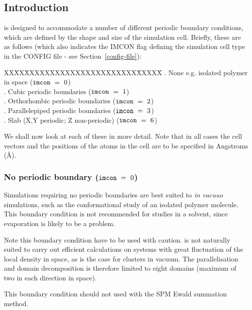 \label{boundary-conditions}
\subsection*{Introduction}

\D is designed to accommodate a number of different periodic
boundary conditions, which are defined
by the shape and size of the simulation cell.  Briefly, these are
as follows (which also indicates the IMCON flag defining the
simulation cell type in the CONFIG file - see Section~\ref{config-file}):
\begin{tabbing}
XX\=XX\=XXXXXXXXXXXXXXXXXXXXXX\=XXXXX\=\kill
 . \> None e.g. isolated polymer in space                  \> (${\tt imcon}~=~0$) \\
 . \> Cubic periodic boundaries \> (${\tt imcon}~=~1$) \\
 . \> Orthorhombic periodic boundaries                     \> (${\tt imcon}~=~2$) \\
 . \> Parallelepiped periodic boundaries                   \> (${\tt imcon}~=~3$) \\
 . \> Slab (X,Y periodic; Z non-periodic)                  \> (${\tt imcon}~=~6$)
\end{tabbing}
We shall now look at each of these in more detail.  Note that in
all cases the cell vectors and the positions of the atoms in the
cell are to be specified in Angstroms (\AA).

\subsubsection*{No periodic boundary (${\tt imcon}~=~0$)}

Simulations requiring no periodic boundaries are best suited to
{\em in vacuuo} simulations, such as the conformational study of
an isolated polymer molecule.  This boundary condition is not
recommended for studies in a solvent, since evaporation is likely
to be a problem.

Note this boundary condition have to be used with caution.  \D is
not naturally suited to carry out efficient calculations on
systems with great fluctuation of the local density in space, as
is the case for clusters in vacuum.  The parallelisation and
domain decomposition is therefore limited to eight domains
(maximum of two in each direction in space).

This boundary condition should not used with the SPM Ewald
summation method.


